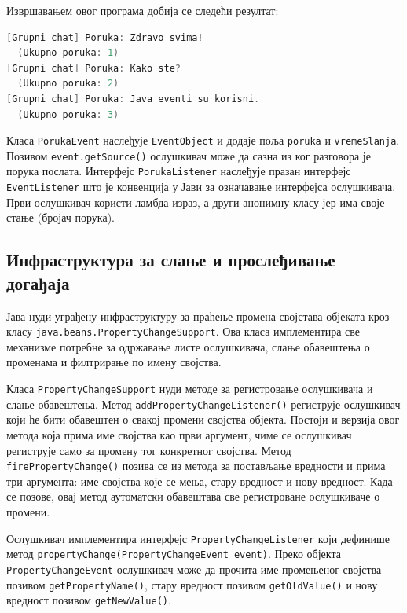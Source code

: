 Извршавањем овог програма добија се следећи резултат:


\begin{lstlisting}[language=Java]
[Grupni chat] Poruka: Zdravo svima!
  (Ukupno poruka: 1)
[Grupni chat] Poruka: Kako ste?
  (Ukupno poruka: 2)
[Grupni chat] Poruka: Java eventi su korisni.
  (Ukupno poruka: 3)
\end{lstlisting}


Класа \texttt{PorukaEvent} наслеђује \texttt{EventObject} и додаје поља \texttt{poruka} и \texttt{vremeSlanja}. Позивом \texttt{event.getSource()} ослушкивач може да сазна из ког разговора је порука послата. Интерфејс \texttt{PorukaListener} наслеђује празан интерфејс \texttt{EventListener} што је конвенција у Јави за означавање интерфејса ослушкивача. Први ослушкивач користи ламбда израз, а други анонимну класу јер има своје стање (бројач порука).


\subsection{Инфраструктура за слање и прослеђивање догађаја}

Јава нуди уграђену инфраструктуру за праћење промена својстава објеката кроз класу \texttt{java.beans.PropertyChangeSupport}. Ова класа имплементира све механизме потребне за одржавање листе ослушкивача, слање обавештења о променама и филтрирање по имену својства.

Класа \texttt{PropertyChangeSupport} нуди методе за регистровање ослушкивача и слање обавештења. Метод \texttt{addPropertyChangeListener()} региструје ослушкивач који ће бити обавештен о свакој промени својства објекта. Постоји и верзија овог метода која прима име својства као први аргумент, чиме се ослушкивач региструје само за промену тог конкретног својства. Метод \texttt{firePropertyChange()} позива се из метода за постављање вредности и прима три аргумента: име својства које се мења, стару вредност и нову вредност. Када се позове, овај метод аутоматски обавештава све регистроване ослушкиваче о промени.

Ослушкивач имплементира интерфејс \texttt{PropertyChangeListener} који дефинише метод \texttt{propertyChange(PropertyChangeEvent event)}. Преко објекта \texttt{PropertyChangeEvent} ослушкивач може да прочита име промењеног својства позивом \texttt{getPropertyName()}, стару вредност позивом \texttt{getOldValue()} и нову вредност позивом \texttt{getNewValue()}.


\bigskip


